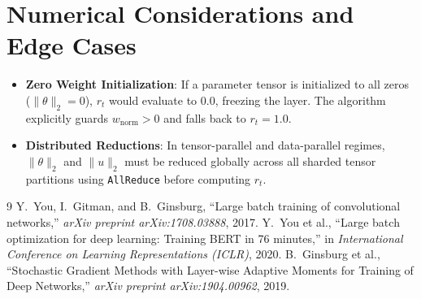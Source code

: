 \documentclass[11pt,a4paper]{article}
\theoremstyle{definition}
\begin{document}
\section{Numerical Considerations and Edge Cases}

\begin{itemize}
    \item \textbf{Zero Weight Initialization}: If a parameter tensor is initialized to all zeros ($\|\theta\|_2 = 0$), $r_t$ would evaluate to $0.0$, freezing the layer. The algorithm explicitly guards $w_{\text{norm}} > 0$ and falls back to $r_t = 1.0$.
    \item \textbf{Distributed Reductions}: In tensor-parallel and data-parallel regimes, $\|\theta\|_2$ and $\|u\|_2$ must be reduced globally across all sharded tensor partitions using \texttt{AllReduce} before computing $r_t$.
\end{itemize}

\begin{thebibliography}{9}
 Y.~You, I.~Gitman, and B.~Ginsburg, ``Large batch training of convolutional networks,'' \emph{arXiv preprint arXiv:1708.03888}, 2017.
 Y.~You et al., ``Large batch optimization for deep learning: Training BERT in 76 minutes,'' in \emph{International Conference on Learning Representations (ICLR)}, 2020.
 B.~Ginsburg et al., ``Stochastic Gradient Methods with Layer-wise Adaptive Moments for Training of Deep Networks,'' \emph{arXiv preprint arXiv:1904.00962}, 2019.
\end{thebibliography}
\end{document}
